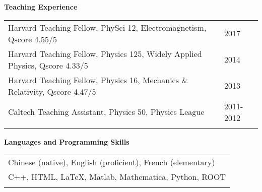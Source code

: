 \documentclass[letterpaper,11pt,oneside]{article}
\begin{document}
\raggedright
\textbf{\Large{Teaching Experience}} \\
 \normalsize
\begin{flushleft}
    \begin{tabular}{@{} l l }
 Harvard Teaching Fellow, PhySci 12, Electromagnetism, Qscore 4.55/5  & 2017\\
 Harvard Teaching Fellow, Physics 125, Widely Applied Physics, Qscore 4.33/5  & 2014\\
 Harvard Teaching Fellow, Physics 16, Mechanics \& Relativity, Qscore 4.47/5 & 2013\\
 Caltech Teaching Assistant, Physics 50, Physics League & 2011-2012\\
    \hspace{0.8\linewidth} & \hspace{0.1\linewidth} \\
     \end{tabular}
\end{flushleft}
\vspace{-0.25cm}

 \raggedright
 \textbf{\Large{Languages and Programming Skills}} \\
 \normalsize
 \begin{flushleft}
 \begin{tabular}{@{} l}
     Chinese (native), English (proficient), French (elementary)\\
     C++, HTML, \LaTeX, Matlab, Mathematica, Python, ROOT \\
     \\
      \end{tabular}
\end{flushleft}



\clearpage
\end{document}

